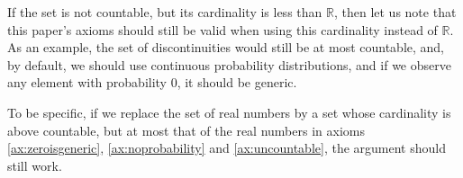 \documentclass[a4paper
,draft
]{article}
\def\reale{\mathbb{R}}
\newcommand{\paper}[1]{paper}
\newcommand{\ghilimele}[1]{``#1"}
\begin{document}
If the set is not countable, but its cardinality is less than $\reale$, then
let us note that this paper's axioms should still be valid when using this
cardinality instead of $\reale$.
As an example, the set of discontinuities would still be at most countable,
and, by default, we should use continuous probability distributions, and
if we observe any element with probability $0$, it should be generic.

To be specific, if we replace the set of real numbers by a set whose
cardinality is above countable, but at most that of the real numbers
in axioms \ref{ax:zeroisgeneric}, \ref{ax:noprobability} and
\ref{ax:uncountable}, the argument should still work.





\end{document}
